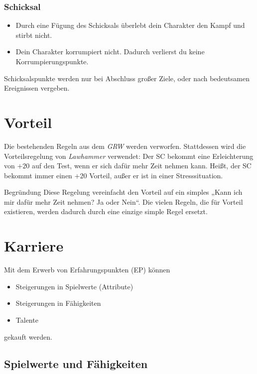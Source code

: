 \documentclass[a4paper,10pt,twoside,twocolumn,openany,nodeprecatedcode,bg=print]{dndbook}
\begin{document}
\subsubsection{Schicksal}
\begin{itemize}
  \item Durch eine Fügung des Schicksals überlebt dein Charakter den Kampf und stirbt nicht.
  \item Dein Charakter korrumpiert nicht. Dadurch verlierst du keine Korrumpierungspunkte.
\end{itemize}
Schicksalspunkte werden nur bei Abschluss großer Ziele, oder nach bedeutsamen Ereignissen vergeben.

\section{Vorteil}
Die bestehenden Regeln aus dem \textit{GRW} werden verworfen.
Stattdessen wird die Vorteilsregelung von \textit{Lawhammer} verwendet: Der SC bekommt eine Erleichterung von $+20$ auf den Test, wenn er sich dafür mehr Zeit nehmen kann. Heißt, der SC bekommt immer einen $+20$ Vorteil, außer er ist in einer Stresssituation.

\begin{DndComment}{Begründung}
  Diese Regelung vereinfacht den Vorteil auf ein simples „Kann ich mir dafür mehr Zeit nehmen? Ja oder Nein“. Die vielen Regeln, die für Vorteil existieren, werden dadurch durch eine einzige simple Regel ersetzt.
\end{DndComment}


\vspace{\fill}
\pagebreak

\section{Karriere}
Mit dem Erwerb von Erfahrungspunkten (EP) können
\begin{itemize}
  \item Steigerungen in Spielwerte (Attribute)
  \item Steigerungen in Fähigkeiten
  \item Talente
\end{itemize}
gekauft werden.

\subsection[short]{Spielwerte und Fähigkeiten}
\end{document}
